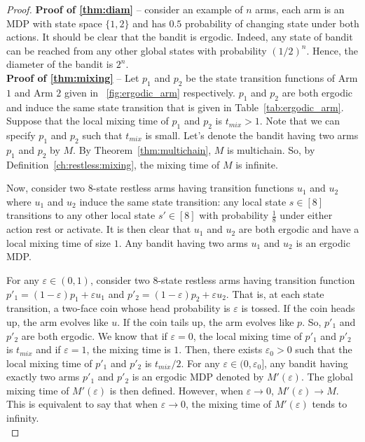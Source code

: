 \begin{proof}
    \textbf{Proof of \ref{thm:diam}} -- consider an example of $n$ arms, each arm is an MDP with state space $\{1,2\}$ and has $0.5$ probability of changing state under both actions.
    It should be clear that the bandit is ergodic.
    Indeed, any state of bandit can be reached from any other global states with probability $(1/2)^n$.
    Hence, the diameter of the bandit is $2^n$.
    \medskip \\

    \textbf{Proof of \ref{thm:mixing}} -- Let $p_1$ and $p_2$ be the state transition functions of Arm $1$ and Arm $2$ given in \figurename~\ref{fig:ergodic_arm} respectively.
    $p_1$ and $p_2$ are both ergodic and induce the same state transition that is given in Table~\ref{tab:ergodic_arm}.
    Suppose that the local mixing time of $p_1$ and $p_2$ is $t_{mix}>1$.
    Note that we can specify $p_1$ and $p_2$ such that $t_{mix}$ is small.
    Let's denote the bandit having two arms $p_1$ and $p_2$ by $M$.
    By Theorem~\ref{thm:multichain}, $M$ is multichain.
    So, by Definition~\ref{ch:restless:mixing}, the mixing time of $M$ is infinite.

    Now, consider two 8-state restless arms having transition functions $u_1$ and $u_2$ where $u_1$ and $u_2$ induce the same state transition: any local state $s\in[8]$ transitions to any other local state $s'\in[8]$ with probability $\frac18$ under either action rest or activate.
    It is then clear that $u_1$ and $u_2$ are both ergodic and have a local mixing time of size $1$.
    Any bandit having two arms $u_1$ and $u_2$ is an ergodic MDP.

    For any $\varepsilon\in(0,1)$, consider two 8-state restless arms having transition function $p'_1=(1-\varepsilon)p_1+\varepsilon u_1$ and $p'_2=(1-\varepsilon)p_2+\varepsilon u_2$.
    That is, at each state transition, a two-face coin whose head probability is $\varepsilon$ is tossed.
    If the coin heads up, the arm evolves like $u$.
    If the coin tails up, the arm evolves like $p$.
    So, $p'_1$ and $p'_2$ are both ergodic.
    We know that if $\varepsilon=0$, the local mixing time of $p'_1$ and $p'_2$ is $t_{mix}$ and if $\varepsilon=1$, the mixing time is $1$.
    Then, there exists $\varepsilon_0>0$ such that the local mixing time of $p'_1$ and $p'_2$ is $t_{mix}/2$.
    For any $\varepsilon\in(0,\varepsilon_0]$, any bandit having exactly two arms $p'_1$ and $p'_2$ is an ergodic MDP denoted by $M'(\varepsilon)$.
    The global mixing time of $M'(\varepsilon)$ is then defined.
    However, when $\varepsilon\to0$, $M'(\varepsilon)\to M$.
    This is equivalent to say that when $\varepsilon\to0$, the mixing time of $M'(\varepsilon)$ tends to infinity.
    \medskip \\


\end{proof}
